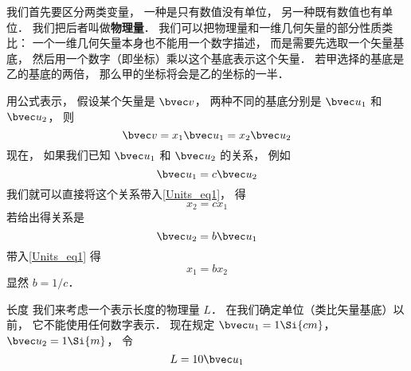 

我们首先要区分两类变量， 一种是只有数值没有单位， 另一种既有数值也有单位． 我们把后者叫做\textbf{物理量}． 我们可以把物理量和一维几何矢量的部分性质类比： 一个一维几何矢量本身也不能用一个数字描述， 而是需要先选取一个矢量基底， 然后用一个数字（即坐标）乘以这个基底表示这个矢量． 若甲选择的基底是乙的基底的两倍， 那么甲的坐标将会是乙的坐标的一半．

用公式表示， 假设某个矢量是 $\bvec v$， 两种不同的基底分别是 $\bvec u_1$ 和 $\bvec u_2$， 则
\begin{equation}\label{Units_eq1}
\bvec v = x_1 \bvec u_1 = x_2 \bvec u_2
\end{equation}
现在， 如果我们已知 $\bvec u_1$ 和 $\bvec u_2$ 的关系， 例如
\begin{equation}\label{Units_eq2}
\bvec u_1 = c \bvec u_2
\end{equation}
我们就可以直接将这个关系带入\autoref{Units_eq1}， 得
\begin{equation}
x_2 = c x_1
\end{equation}
若给出得关系是
\begin{equation}
\bvec u_2 = b\bvec u_1
\end{equation}
带入\autoref{Units_eq1} 得
\begin{equation}
x_1 = b x_2
\end{equation}
显然 $b = 1/c$．

\begin{example}{长度}
我们来考虑一个表示长度的物理量 $L$． 在我们确定单位（类比矢量基底）以前， 它不能使用任何数字表示． 现在规定 $\bvec u_1 = 1\Si{cm}$， $\bvec u_2 = 1\Si{m}$， 令
\begin{equation}
L = 10 \bvec u_1
\end{equation}

\end{example}
